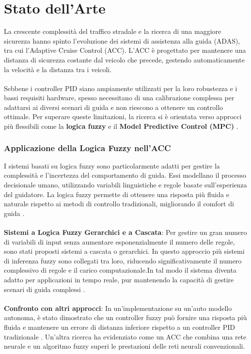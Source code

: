 \chapter{Stato dell'Arte}
La crescente complessità del traffico stradale e la ricerca di una maggiore sicurezza hanno spinto l'evoluzione dei sistemi di 
assistenza alla guida (ADAS), tra cui l'Adaptive Cruise Control (ACC). L'ACC è progettato per mantenere una distanza di sicurezza 
costante dal veicolo che precede, gestendo automaticamente la velocità e la distanza tra i veicoli.
\\\\
\noindent Sebbene i controller PID siano ampiamente utilizzati per la loro robustezza e i bassi requisiti hardware, spesso necessitano di 
una calibrazione complessa per adattarsi ai diversi scenari di guida e non riescono a ottenere un controllo ottimale. Per superare 
queste limitazioni, la ricerca si è orientata verso approcci più flessibili come la \textbf{logica fuzzy} 
e il \textbf{Model Predictive Control (MPC)} \cite{singh2015adaptive}.

\subsection*{Applicazione della Logica Fuzzy nell'ACC}
I sistemi basati su logica fuzzy sono particolarmente adatti per gestire la complessità e l'incertezza del 
comportamento di guida. Essi modellano il processo decisionale umano, utilizzando variabili linguistiche e regole 
basate sull'esperienza del guidatore. La logica fuzzy permette di ottenere una risposta più fluida e naturale rispetto 
ai metodi di controllo tradizionali, migliorando il comfort di guida \cite{simic2022cascaded}.
\\\\
\noindent \textbf{Sistemi a Logica Fuzzy Gerarchici e a Cascata}: Per gestire un gran numero di variabili di input 
senza aumentare esponenzialmente il numero delle regole, sono stati proposti sistemi a cascata o gerarchici. 
In questo approccio più sistemi di inferenza fuzzy sono collegati tra loro, riducendo significativamente il numero 
complessivo di regole e il carico computazionale.In tal modo il sistema diventa adatto per applicazioni in tempo reale, 
pur mantenendo la capacità di gestire scenari di guida complessi \cite{simic2022cascaded}.
\\\\
\noindent\textbf{Confronto con altri approcci}: In un'implementazione su un'auto modello autonoma, è stato dimostrato che un controller 
fuzzy può fornire una risposta più fluida e mantenere un errore di distanza inferiore rispetto a un controller PID 
tradizionale \cite{alomari2020fuzzy}. Un'altra ricerca ha evidenziato come un ACC che combina una rete neurale e un algoritmo 
fuzzy superi le prestazioni delle reti neurali convenzionali.

